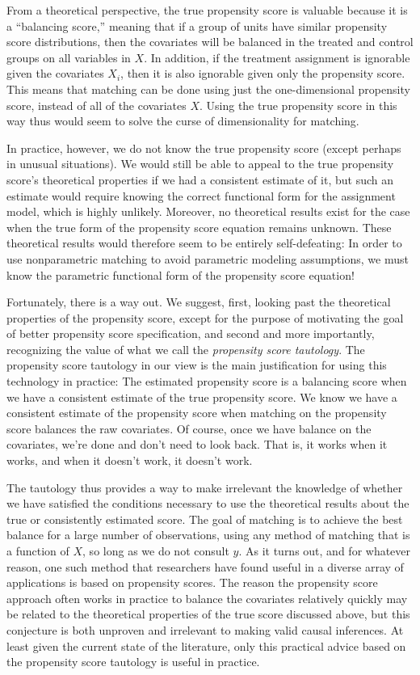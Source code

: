 \documentclass[11pt,titlepage]{article}
\begin{document}
From a theoretical perspective, the true propensity score is valuable
because it is a ``balancing score,'' meaning that if a group of units
have similar propensity score distributions, then the covariates will
be balanced in the treated and control groups on all variables in $X$.
In addition, if the treatment assignment is ignorable given the
covariates $X_i$, then it is also ignorable given only the propensity
score.  This means that matching can be done using just the
one-dimensional propensity score, instead of all of the covariates
$X$.  Using the true propensity score in this way thus would seem to
solve the curse of dimensionality for matching.

In practice, however, we do not know the true propensity score (except
perhaps in unusual situations).  We would still be able to appeal to
the true propensity score's theoretical properties if we had a
consistent estimate of it, but such an estimate would require knowing
the correct functional form for the assignment model, which is highly
unlikely.  Moreover, no theoretical results exist for the case when
the true form of the propensity score equation remains unknown.  These
theoretical results would therefore seem to be entirely
self-defeating: In order to use nonparametric matching to avoid
parametric modeling assumptions, we must know the parametric
functional form of the propensity score equation!

Fortunately, there is a way out.  We suggest, first, looking past the
theoretical properties of the propensity score, except for the purpose
of motivating the goal of better propensity score specification, and
second and more importantly, recognizing the value of what we call the
\emph{propensity score tautology}.  The propensity score tautology in
our view is the main justification for using this technology in
practice: The estimated propensity score is a balancing score when we
have a consistent estimate of the true propensity score.  We know we
have a consistent estimate of the propensity score when matching on
the propensity score balances the raw covariates.  Of course, once we
have balance on the covariates, we're done and don't need to look
back.  That is, it works when it works, and when it doesn't work, it
doesn't work.

The tautology thus provides a way to make irrelevant the knowledge of
whether we have satisfied the conditions necessary to use the
theoretical results about the true or consistently estimated score.
The goal of matching is to achieve the best balance for a large number
of observations, using any method of matching that is a function of
$X$, so long as we do not consult $y$.  As it turns out, and for
whatever reason, one such method that researchers have found useful in
a diverse array of applications is based on propensity scores.  The
reason the propensity score approach often works in practice to
balance the covariates relatively quickly may be related to the
theoretical properties of the true score discussed above, but this
conjecture is both unproven and irrelevant to making valid causal
inferences.  At least given the current state of the literature, only
this practical advice based on the propensity score tautology is
useful in practice.
\end{document}
